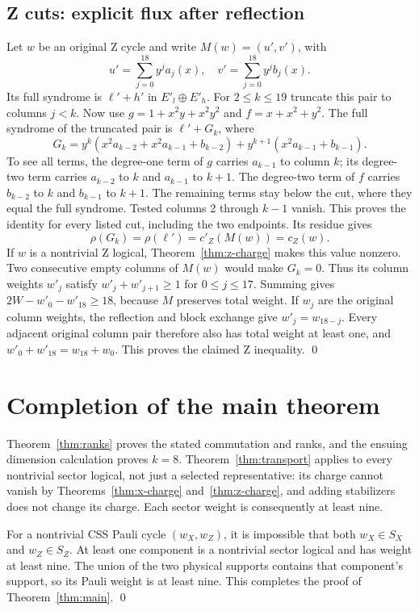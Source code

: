 \documentclass{article}
\begin{document}
\subsection{Z cuts: explicit flux after reflection}\label{sec:z-cuts}

Let \(w\) be an original Z cycle and write \(M(w) = (u', v')\), with
\begin{equation}
  u' = \sum_{j=0}^{18} y^j a_j(x), \quad
  v' = \sum_{j=0}^{18} y^j b_j(x).
\end{equation}
Its full syndrome is \(\ell' + h'\) in \(E'_l \oplus E'_h\). For \(2 \le k \le 19\) truncate
this pair to columns \(j < k\). Now use \(g = 1 + x^2 y + x^2 y^2\) and
\(f = x + x^2 + y^2\). The full syndrome of the truncated pair is \(\ell' + G_k\), where
\begin{equation}
  G_k = y^k (x^2 a_{k-2} + x^2 a_{k-1} + b_{k-2})
  + y^{k+1} (x^2 a_{k-1} + b_{k-1}).
\end{equation}
To see all terms, the degree-one term of \(g\) carries \(a_{k-1}\) to column \(k\); its
degree-two term carries \(a_{k-2}\) to \(k\) and \(a_{k-1}\) to \(k + 1\). The degree-two
term of \(f\) carries \(b_{k-2}\) to \(k\) and \(b_{k-1}\) to \(k + 1\). The remaining terms
stay below the cut, where they equal the full syndrome. Tested columns 2 through \(k - 1\)
vanish. This proves the identity for every listed cut, including the two endpoints. Its
residue gives
\begin{equation}
  \rho(G_k) = \rho(\ell') = c'_Z(M(w)) = c_Z(w).
\end{equation}
If \(w\) is a nontrivial Z logical, Theorem~\ref{thm:z-charge} makes this value nonzero. Two
consecutive empty columns of \(M(w)\) would make \(G_k = 0\). Thus its column weights
\(w'_j\) satisfy \(w'_j + w'_{j+1} \ge 1\) for \(0 \le j \le 17\). Summing gives
\(2W - w'_0 - w'_{18} \ge 18\), because \(M\) preserves total weight. If \(w_j\) are the
original column weights, the reflection and block exchange give \(w'_j = w_{18-j}\). Every
adjacent original column pair therefore also has total weight at least one, and
\(w'_0 + w'_{18} = w_{18} + w_0\). This proves the claimed Z inequality. \qed

\section{Completion of the main theorem}\label{sec:completion}

Theorem~\ref{thm:ranks} proves the stated commutation and ranks, and the ensuing dimension
calculation proves \(k = 8\). Theorem~\ref{thm:transport} applies to every nontrivial sector
logical, not just a selected representative: its charge cannot vanish by
Theorems~\ref{thm:x-charge} and~\ref{thm:z-charge}, and adding stabilizers does not change
its charge. Each sector weight is consequently at least nine.

For a nontrivial CSS Pauli cycle \((w_X, w_Z)\), it is impossible that both
\(w_X \in S_X\) and \(w_Z \in S_Z\). At least one component is a nontrivial sector logical
and has weight at least nine. The union of the two physical supports contains that
component's support, so its Pauli weight is at least nine. This completes the proof of
Theorem~\ref{thm:main}. \qed
\end{document}
